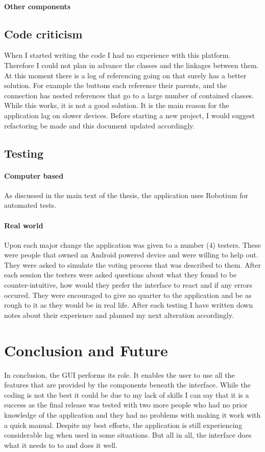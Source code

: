 \documentclass[11pt]{article} %
\begin{document}
\paragraph{Other components}
\subsection{Code criticism}
When I started writing the code I had no experience with this platform. Therefore I could not plan in advance the classes and the linkages between them. At this moment there is a log of referencing going on that surely has a better solution. For example the buttons each reference their parents, and the connection has nested references that go to a large number of contained classes. While this works, it is not a good solution. It is the main reason for the application lag on slower devices. Before starting a new project, I would suggest refactoring be made and this document updated accordingly.
\subsection{Testing}
\paragraph{Computer based}
As discussed in the main text of the thesis, the application uses Robotium for automated tests.
\paragraph{Real world}
Upon each major change the application was  given to a number (4) testers. These were people that owned an Android powered device and were willing to help out. They were asked to simulate the voting process that was described to them. After each session the testers were asked questions about what they found to be counter-intuitive, how would they prefer the interface to react and if any errors occured. They were encouraged to give no quarter to the application and be as rough to it as they would be in real life. After each testing I have written down notes about their experience and planned my next alteration accordingly.
\section{Conclusion and Future}

In conclusion, the GUI performs its role. It enables the user to use all the features that are provided by the components beneath the interface. While the coding is not the best it could be due to my lack of skills I can say that it is a success as the final release was tested with two more people who had no prior knowledge of the application and they had no problems with making it work with a quick manual. Despite my best efforts, the application is still experiencing considerable lag when used in some situations. But all in all, the interface does what it needs to to and does it well.







\end{document}
